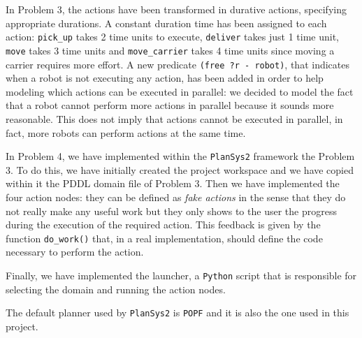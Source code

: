 In Problem 3, the actions have been transformed in durative actions, specifying appropriate durations.
A constant duration time has been assigned to each action: \texttt{pick\_up} takes 2 time units to execute,
\texttt{deliver} takes just 1 time unit, \texttt{move} takes 3 time units and \texttt{move\_carrier} takes 4
time units since moving a carrier requires more effort.
A new predicate \texttt{(free ?r - robot)}, that indicates when a robot is not executing any action,
has been added in order to help modeling which actions can be executed in parallel: we decided to model the 
fact that a robot cannot perform more actions in parallel because it sounds more reasonable.
This does not imply that actions cannot be executed in parallel, in fact, more robots can perform
actions at the same time. 

In Problem 4, we have implemented within the \texttt{PlanSys2} framework the Problem 3.
To do this, we have initially created the project workspace and we have copied within it the PDDL domain 
file of Problem 3.
Then we have implemented the four action nodes: they can be defined as \textit{fake actions} in the sense 
that they do not really make any useful work but they only shows to the user the progress during the 
execution of the required action. This feedback is given by the function \texttt{do\_work()} that, in
a real implementation, should define the code necessary to perform the action.

Finally, we have implemented the launcher, a \texttt{Python} script that is responsible for selecting the
domain and running the action nodes.

The default planner used by \texttt{PlanSys2} is \texttt{POPF} and it is also the one used in this project.

